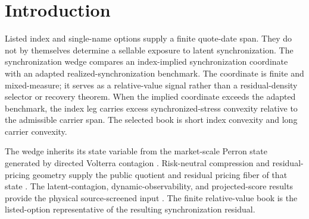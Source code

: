 \documentclass[11pt,a4paper]{amsart}
\theoremstyle{plain}
\theoremstyle{definition}
\theoremstyle{remark}
\begin{document}
\begin{abstract}
The empirical implementation uses listed OptionMetrics contracts, validated underlying prices, and
rolling Oxford--Man Perron stress states.  Over the 2001--2018 execution ledger, the balanced
lower-bound specification forms \(1{,}496\) sign-positive candidate books and allocates capital to
\(906\) rows over \(805\) active dates.  At 1x bid--ask costs it reports total execution P\&L
\(24.567\) million, annualized Sharpe \(3.958\), expected-shortfall loss \(23{,}683\), and max
drawdown \(364{,}148\).  A mechanical leakage audit, cost-stress grid, mandate frontier, dormancy
audit, and capital-realism report accompany the run.  The implementation is formation-adapted
under those checks, but it was developed on the available sample.  The ledger is therefore an
audited sample-developed implementation rather than an unused-sample trading record.
\end{abstract}

\maketitle

\section{Introduction}\label{sec:intro}

Listed index and single-name options supply a finite quote-date span.  They do
not by themselves determine a sellable exposure to latent synchronization.  The synchronization
wedge compares an index-implied synchronization coordinate with an adapted realized-synchronization
benchmark.  The coordinate is finite and mixed-measure; it serves as a relative-value signal rather
than a residual-density selector or recovery theorem.  When the implied coordinate exceeds the
adapted benchmark, the index leg carries excess synchronized-stress convexity relative to the
admissible carrier span.  The selected
book is short index convexity and long carrier convexity.

The wedge inherits its state variable from the market-scale Perron state generated by directed
Volterra contagion \cite{vidal2026market}.  Risk-neutral compression and residual-pricing geometry
supply the public quotient and residual pricing fiber of that state
\cite{vidal2026compression,vidal2026pricing}.  The latent-contagion, dynamic-observability, and
projected-score results provide the physical source-screened input
\cite{vidal2026latent,vidal2026dynamic,vidal2026econometric}.  The finite relative-value book is
the listed-option representative of the resulting synchronization residual.
\end{document}

